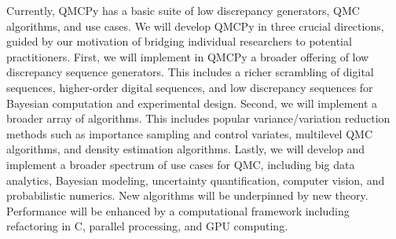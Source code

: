 \documentclass[11pt]{article}%
\begin{document}

\noindent Currently, QMCPy has a basic suite of low discrepancy generators, QMC algorithms,  and use cases. We will develop QMCPy in three crucial directions, guided by our motivation of bridging individual researchers to potential practitioners. First, we will implement in QMCPy a broader offering of low discrepancy sequence generators.  This includes a richer scrambling of digital sequences, higher-order digital sequences, and low discrepancy sequences for Bayesian computation and experimental design. Second, we will implement a broader array of algorithms. This includes popular variance/variation reduction methods such as importance sampling and control variates, multilevel QMC algorithms, and density estimation algorithms. Lastly, we will develop and implement a broader spectrum of use cases for QMC, including big data analytics, Bayesian modeling, uncertainty quantification, computer vision, and probabilistic numerics. New algorithms will be underpinned by new theory.  Performance will be enhanced by a computational framework including refactoring in C, parallel processing, and GPU computing.

\bigskip


\end{document}
